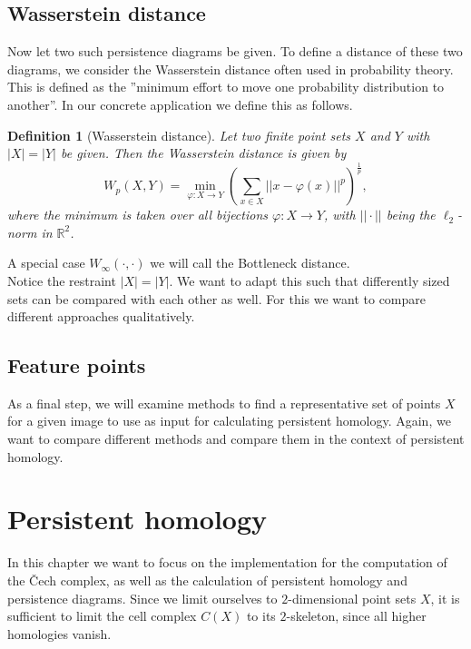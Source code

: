 \documentclass[11pt, a4paper, UKenglish]{article}
\newtheorem{definition}{Definition}
\newcommand{\bR}{\mathbb{R}}
\begin{document}
    \subsection{Wasserstein distance}\label{subsec:wasserstein-distance}

    Now let two such persistence diagrams be given.
    To define a distance of these two diagrams, we consider the Wasserstein distance often used in probability theory.
    This is defined as the ''minimum effort to move one probability distribution to another''.
    In our concrete application we define this as follows.
    \begin{definition}[Wasserstein distance]
        Let two finite point sets $X$ and $Y$ with $|X|=|Y|$ be given.
        Then the Wasserstein distance is given by\[W_p(X,Y) = \min_{\varphi:X\rightarrow Y}\left(\sum_{x\in X}||x-\varphi(x)||^p\right)^{\frac{1}{p}},\]
        where the minimum is taken over all bijections $\varphi:X\rightarrow Y$, with $||\cdot||$ being the $\ell_2$-norm in $\bR^2$.
    \end{definition}
    A special case $W_\infty(\cdot,\cdot)$ we will call the Bottleneck distance.\\
    Notice the restraint $|X| = |Y|$.
    We want to adapt this such that differently sized sets can be compared with each other as well.
    For this we want to compare different approaches qualitatively.

    \subsection{Feature points}\label{subsec:feature-proposals}

    As a final step, we will examine methods to find a representative set of points $X$ for a given image to use as input for calculating persistent homology.
    Again, we want to compare different methods and compare them in the context of persistent homology.
    \section{Persistent homology}\label{sec:persistent-homology2}

    In this chapter we want to focus on the implementation for the computation of the Čech complex, as well as the calculation of persistent homology and persistence diagrams.
    Since we limit ourselves to $2$-dimensional point sets $X$, it is sufficient to limit the cell complex $C(X)$ to its $2$-skeleton, since all higher homologies vanish.
\end{document}
